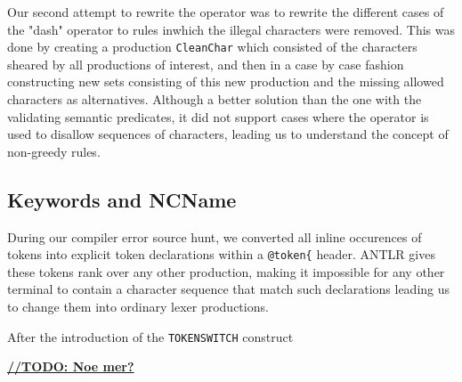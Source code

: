 Our second attempt to rewrite the operator was to rewrite the different cases of the "dash" operator to rules inwhich the illegal characters were removed. This was done by creating a production \verb!CleanChar! which consisted of the characters sheared by all productions of interest, and then in a case by case fashion constructing new sets consisting of this new production and the missing allowed characters as alternatives. Although a better solution than the one with the validating semantic predicates, it did not support cases where the operator is used to disallow sequences of characters, leading us to understand the concept of non-greedy rules.

\subsection{Keywords and NCName}
During our compiler error source hunt, we converted all inline occurences of tokens into explicit token declarations within a \verb!@token{! header. ANTLR gives these tokens rank over any other production, making it impossible for any other terminal to contain a character sequence that match such declarations leading us to change them into ordinary lexer productions.

After the introduction of the \verb!TOKENSWITCH! construct

\underline{\textbf{\LARGE //TODO: Noe mer?}}